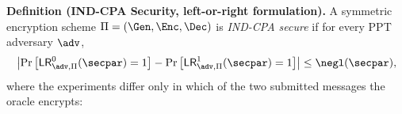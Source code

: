 \textbf{Definition (IND-CPA Security, left-or-right formulation).}
A symmetric encryption scheme $\Pi = (\Gen, \Enc, \Dec)$ is
\emph{IND-CPA secure} if for every PPT adversary $\adv$,
\[
\left| \Pr\left[ \mathsf{LR}^{0}_{\adv,\Pi}(\secpar) = 1 \right]
- \Pr\left[ \mathsf{LR}^{1}_{\adv,\Pi}(\secpar) = 1 \right] \right|
\le \negl(\secpar),
\]
where the experiments differ only in which of the two submitted messages the
oracle encrypts:

\begin{pchstack}[center]
\pchspace
{}
\end{pchstack}
